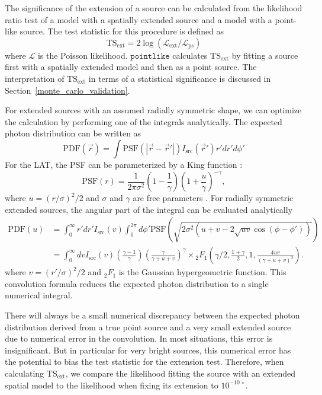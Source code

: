 \documentclass[12pt,preprint]{aastex}
\newcommand{\tsext}{{\ensuremath{\text{TS}_{\text{ext}}}}\xspace}
\newcommand{\likelihood}{\ensuremath{\mathcal{L}}\xspace}
\newcommand{\pointlike}{\ensuremath{\mathtt{pointlike}}\xspace}
\begin{document}
The significance of the extension of a source can be calculated from the
likelihood ratio test of a model with a spatially extended source and
a model with a point-like source. The test statistic for this procedure
is defined as
\begin{equation}
  \tsext=2\log(\likelihood_\text{ext}/\likelihood_\text{ps}) 
\end{equation}
where \likelihood is the Poisson likelihood.
\pointlike calculates \tsext by fitting a source first with a spatially
extended model and then as a point source.  The interpretation
of \tsext in terms of a statistical significance is discussed in
Section~\ref{monte_carlo_validation}.

For extended sources with an assumed radially symmetric shape,
we can optimize the calculation by performing one
of the integrals analytically.
The expected photon 
distribution can be written as
\begin{equation}
  \text{PDF}(\vec r) = \int  \text{PSF}(|\vec r - \vec r'|)I_\text{src}(\vec r') r' dr' d\phi'
\end{equation}
For the LAT, the PSF can be parameterized by a King function \citep{king_function}:
\begin{equation}
  \text{PSF}(r) = 
  \frac{1}{2\pi\sigma^2}
  \left(1-\frac{1}{\gamma}\right)
  \left(1+\frac{u}{\gamma}\right)^{-\gamma},
\end{equation}
where $u=(r/\sigma)^2/2$ and $\sigma$ and $\gamma$ are free parameters
\citep{matthew_kerr_thesis}.  For radially symmetric extended sources,
the angular part of the integral can be evaluated analytically
\begin{align}
  \text{PDF}(u) & = \int_0^\infty r' dr'
  I_\text{src}(v) 
  \int_0^{2\pi} d\phi' 
  \text{PSF}(\sqrt{2\sigma^2(u+v-2\sqrt{uv}\cos(\phi-\phi'))})
  \\
  & = \int_0^\infty dv
  I_\text{src}(v) 
  \left(\frac{\gamma-1}{\gamma}\right)
  \left( \frac{\gamma}{\gamma + u + v}\right)^\gamma 
  \times {}_2F_1 \left(\gamma/2,\frac{1+\gamma}{2},1,\frac{4uv}{(\gamma+u+v)^2}\right).
\end{align}
where $v=(r'/\sigma)^2/2$ and ${}_2F_1$ is the Gaussian hypergeometric
function.  This convolution formula reduces the expected photon
distribution to a single numerical integral.

There will always be a small numerical discrepancy between the expected
photon distribution derived from a true point source and a very small
extended source due to numerical error in the convolution.  In most
situations, this error is insignificant.  But in particular for
very bright sources, this numerical error has the potential to bias the
test statistic for the extension test. Therefore, when calculating
\tsext, we compare the likelihood fitting the source with an extended
spatial model to the likelihood when fixing its extension to $10^{-10\,\circ}$.
\end{document}
